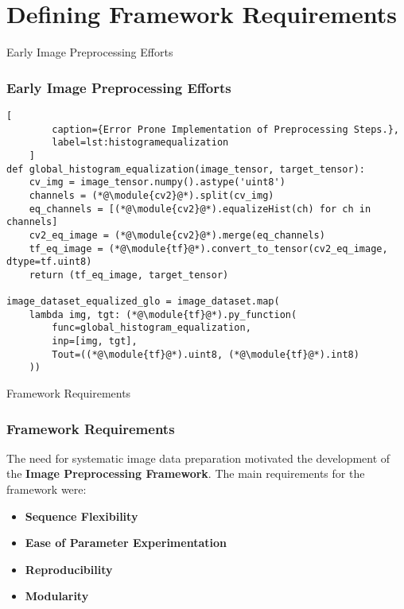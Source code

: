 \section{Defining Framework Requirements}
\label{defining_framework_requirements_section}


\begin{frame}[fragile]{Early Image Preprocessing Efforts}
    \frametitle{Early Image Preprocessing Efforts}
    \begin{lstlisting}[
        caption={Error Prone Implementation of Preprocessing Steps.}, 
        label=lst:histogramequalization
    ]
def global_histogram_equalization(image_tensor, target_tensor):
    cv_img = image_tensor.numpy().astype('uint8')
    channels = (*@\module{cv2}@*).split(cv_img)
    eq_channels = [(*@\module{cv2}@*).equalizeHist(ch) for ch in channels]  
    cv2_eq_image = (*@\module{cv2}@*).merge(eq_channels)
    tf_eq_image = (*@\module{tf}@*).convert_to_tensor(cv2_eq_image, dtype=tf.uint8) 
    return (tf_eq_image, target_tensor)

image_dataset_equalized_glo = image_dataset.map(
    lambda img, tgt: (*@\module{tf}@*).py_function(
        func=global_histogram_equalization, 
        inp=[img, tgt], 
        Tout=((*@\module{tf}@*).uint8, (*@\module{tf}@*).int8)
    ))
    \end{lstlisting}
\end{frame}

\begin{frame}{Framework Requirements}
    \frametitle{Framework Requirements}
    The need for systematic image data preparation motivated the development of the \textbf{Image Preprocessing Framework}. The main requirements for the framework were:
    \vspace{0.5em}
    \begin{itemize}
        \item \textbf{Sequence Flexibility} %
        \item \textbf{Ease of Parameter Experimentation} %
        \item \textbf{Reproducibility} %
        \item \textbf{Modularity} %
    \end{itemize}
\end{frame}

